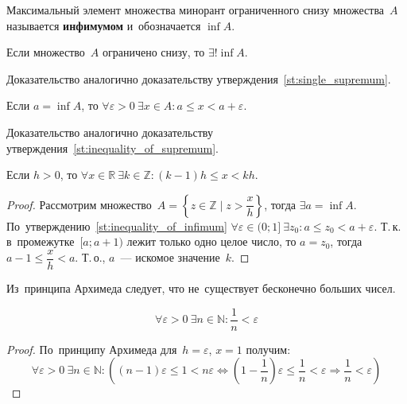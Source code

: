 \hypertarget{def:infimum}{} Максимальный элемент множества минорант ограниченного снизу множества~$A$ называется \textbf{инфимумом} и~обозначается $\inf A$.

\begin{statement}
Если множество~$A$ ограничено снизу, то $\exists! \inf A$.
\end{statement}%
Доказательство аналогично доказательству утверждения~\ref{st:single_supremum}.

\begin{statement}
\label{st:inequality_of_infimum}
Если $a = \inf A$, то $\forall \varepsilon > 0 \ \exists x \in A \colon a \leqslant x < a + \varepsilon$.
\end{statement}%
Доказательство аналогично доказательству утверждения~\ref{st:inequality_of_supremum}.

\begin{theorem}
Если $h > 0$, то $\forall x \in \mathbb R \ \exists k \in \mathbb Z \colon (k - 1)h \leqslant x < kh$.
\end{theorem}
\begin{proof}
Рассмотрим множество~$A = \left\lbrace z \in \mathbb Z \mid z > \dfrac{x}h \right\rbrace$, тогда $\exists a = \inf A$.
По~утверждению~\ref{st:inequality_of_infimum} $\forall \varepsilon \in (0; 1] \ \exists z_0 \colon a \leqslant z_0 < a + \varepsilon$.
Т.\,к. в~промежутке~$[a; a + 1)$ лежит только одно целое число, то $a = z_0$, тогда $a - 1 \leqslant \dfrac{x}h < a$.
Т.\,о., $a$~--- искомое значение~$k$.
\end{proof}

Из~принципа Архимеда следует, что не~существует бесконечно больших чисел.

\begin{consequent}
\label{conseq:small_rational_exists}
\begin{equation*}
\forall \varepsilon > 0 \ \exists n \in \mathbb N \colon \frac1n < \varepsilon
\end{equation*}
\end{consequent}
\begin{proof}
По~принципу Архимеда для~$h = \varepsilon$, $x = 1$ получим:
\begin{equation*}
\forall \varepsilon > 0 \ \exists n \in \mathbb N \colon
\left( (n - 1)\varepsilon \leqslant 1 < n\varepsilon \Leftrightarrow
(1 - \frac1n)\varepsilon \leqslant \frac1n < \varepsilon \Rightarrow
\frac1n < \varepsilon \right)
\end{equation*}
\end{proof}

